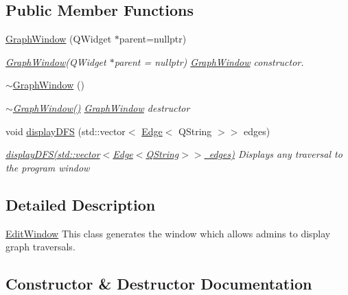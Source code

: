 \subsection*{Public Member Functions}
\begin{DoxyCompactItemize}
\item 
\mbox{\hyperlink{class_graph_window_a68f193cacc0237a41d8c44923b53c11a}{Graph\+Window}} (Q\+Widget $\ast$parent=nullptr)
\begin{DoxyCompactList}\small\item\em \mbox{\hyperlink{class_graph_window}{Graph\+Window}}(Q\+Widget $\ast$parent = nullptr) \mbox{\hyperlink{class_graph_window}{Graph\+Window}} constructor. \end{DoxyCompactList}\item 
\mbox{\hyperlink{class_graph_window_acca1dc8c3eefe6608ae2de3cee2e22ee}{$\sim$\+Graph\+Window}} ()
\begin{DoxyCompactList}\small\item\em \mbox{\hyperlink{class_graph_window_acca1dc8c3eefe6608ae2de3cee2e22ee}{$\sim$\+Graph\+Window()}} \mbox{\hyperlink{class_graph_window}{Graph\+Window}} destructor \end{DoxyCompactList}\item 
void \mbox{\hyperlink{class_graph_window_ac3ea3a3f53626f614cdab8035454f553}{display\+D\+FS}} (std\+::vector$<$ \mbox{\hyperlink{struct_edge}{Edge}}$<$ Q\+String $>$$>$ edges)
\begin{DoxyCompactList}\small\item\em \mbox{\hyperlink{class_graph_window_ac3ea3a3f53626f614cdab8035454f553}{display\+D\+F\+S(std\+::vector$<$\+Edge$<$\+Q\+String$>$$>$ edges)}} Displays any traversal to the program window \end{DoxyCompactList}\end{DoxyCompactItemize}


\subsection{Detailed Description}
\mbox{\hyperlink{class_edit_window}{Edit\+Window}} This class generates the window which allows admins to display graph traversals. 

\subsection{Constructor \& Destructor Documentation}
\mbox{\label{class_graph_window_a68f193cacc0237a41d8c44923b53c11a}} 
